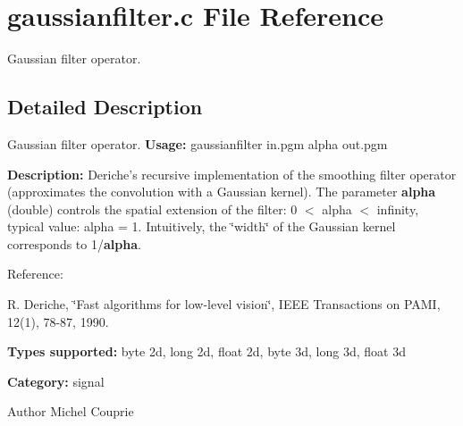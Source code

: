 \section{gaussianfilter.c File Reference}
\label{gaussianfilter_8c}


Gaussian filter operator.  




\subsection{Detailed Description}
Gaussian filter operator. {\bfseries Usage:} gaussianfilter in.pgm alpha out.pgm

{\bfseries Description:} Deriche's recursive implementation of the smoothing filter operator (approximates the convolution with a Gaussian kernel). The parameter {\bfseries alpha} (double) controls the spatial extension of the filter: 0 $<$ alpha $<$ infinity, typical value: alpha = 1. Intuitively, the \char`\"{}width\char`\"{} of the Gaussian kernel corresponds to 1/{\bfseries alpha}.

Reference:\par
 [Der90] R. Deriche, \char`\"{}Fast algorithms for low-\/level vision\char`\"{}, IEEE Transactions on PAMI, 12(1), 78-\/87, 1990.\par


{\bfseries Types supported:} byte 2d, long 2d, float 2d, byte 3d, long 3d, float 3d

{\bfseries Category:} signal

\begin{DoxyAuthor}{Author}
Michel Couprie 
\end{DoxyAuthor}
